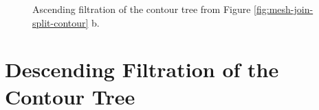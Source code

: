 \begin{appendices}
\begin{figure}[h]

    \caption{Ascending filtration of the contour tree from Figure \ref{fig:mesh-join-split-contour} b.}%
    \label{fig:asc-filtration-tree}%
\end{figure}


\chapter{Descending Filtration of the Contour Tree}
\label{chapter-desc}


\end{appendices}

